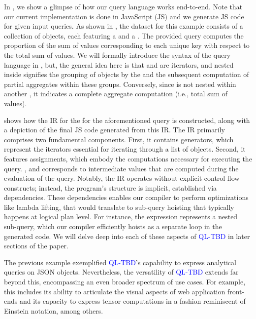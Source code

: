 \documentclass[runningheads]{llncs}
\newcommand{\lang}{\textcolor{blue}{QL-TBD}}
\begin{document}
In , we show a glimpse of how our query language works end-to-end.
Note that our current implementation is done in JavaScript (JS) and we generate JS code for given input queries.
As shown in , the dataset for this example consists of a collection
of objects, each featuring a  and a .
The provided query computes the proportion of the sum of values corresponding to
each unique key with respect to the total sum of values.
We will formally introduce the syntax of the query language in ,
but, the general idea here is that  and  are iterators, and 
 nested inside  signifies the grouping of objects by the
 and the subsequent computation of partial aggregates within these groups.
Conversely, since  is not nested within another , it indicates
a complete aggregate computation (i.e., total sum of values).

 shows how the IR for the  for the aforementioned query is
constructed, along with a depiction of the final JS code generated from this IR.
The IR primarily comprises two fundamental components.
First, it contains generators, which represent the iterators essential for iterating
through a list of objects.
Second, it features assignments, which embody the computations necessary for executing
the query.
,  and  corresponds to intermediate values
that are computed during the evaluation of the query.
Notably, the IR operates without explicit control flow constructs; instead, the
program's structure is implicit, established via dependencies.
These dependencies enables our compiler to perform optimizations like lambda lifting,
that would translate to sub-query hoisting that typically happens at logical plan level.
For instance, the expression  represents a nested sub-query,
which our compiler efficiently hoists as a separate loop in the generated code.
We will delve deep into each of these aspects of \lang{} in later sections of the paper.

The previous example exemplified \lang{}'s capability to express analytical queries on JSON
objects.
Nevertheless, the versatility of \lang{} extends far beyond this, encompassing an even broader
spectrum of use cases. 
For example, this includes its ability to articulate the visual aspects of web application
front-ends and its capacity to express tensor computations in a fashion reminiscent of
Einstein notation, among others.
\end{document}
